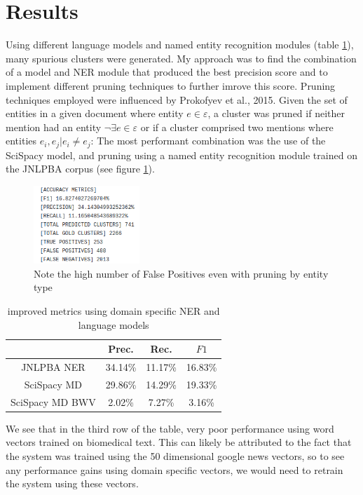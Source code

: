 \documentclass[11pt]{article}
\begin{document}
\section{Results}
Using different language models and named entity recognition modules (table \ref{tab:improvements}), many spurious clusters were generated. My approach was to find the combination of a model and NER module that produced the best precision score and to implement different pruning techniques to further imrove this score. Pruning techniques employed were influenced by Prokofyev et al., 2015. Given the set of entities in a given document where entity $e \in \varepsilon$, a cluster was pruned if neither mention had an entity $\lnot \exists e \in \varepsilon$ or if a cluster comprised two mentions where entities $e_i, e_j \vert e_i \neq e_j$: 
The most performant combination was the use of the SciSpacy model, and pruning using a named entity recognition module trained on the JNLPBA corpus (see figure \ref{fig:false_pos}). 

\begin{figure}[h]
\includegraphics[width=4cm]{highest_prec}
\centering
\caption{Note the high number of False Positives even with pruning by entity type}
\label{fig:false_pos}
\end{figure}
\begin{table}[h]
    \centering
 \begin{tabular}{||c c c c||} 
 \hline
  &  Prec.  & Rec. & $F1$ \\ [0.5ex] 
 \hline\hline
     JNLPBA NER & 34.14\% & 11.17\% & 16.83\% \\ 
     SciSpacy MD & 29.86\% & 14.29\% & 19.33\% \\ 
     SciSpacy MD BWV & 2.02\% & 7.27\% & 3.16\% \\ 
 \hline
\end{tabular}
\caption{improved metrics using domain specific NER and language models}
\label{tab:improvements}
\end{table}

We see that in the third row of the table, very poor performance using word vectors trained on biomedical text. This can likely be attributed to the fact that the system was trained using the 50 dimensional google news vectors, so to see any performance gains using domain specific vectors, we would need to retrain the system using these vectors. \\
\end{document}
